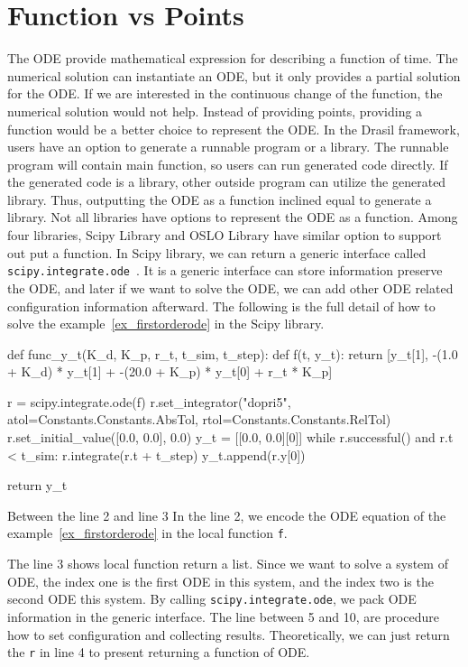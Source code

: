 \section{Function vs Points}
The ODE provide mathematical expression for describing a function of time. The numerical solution can instantiate an ODE, but it only provides a partial solution for the ODE. If we are interested in the continuous change of the function, the numerical solution would not help. Instead of providing points, providing a function would be a better choice to represent the ODE. In the Drasil framework, users have an option to generate a runnable program or a library. The runnable program will contain main function, so users can run generated code directly. If the generated code is a library, other outside program can utilize the generated library. Thus, outputting the ODE as a function inclined equal to generate a library. Not all libraries have options to represent the ODE as a function. Among four libraries, Scipy Library and OSLO Library have similar option to support out put a function. In Scipy library, we can return a generic interface called \verb|scipy.integrate.ode|~\citep{scipyfun}. It is a generic interface can store information preserve the ODE, and later if we want to solve the ODE, we can add other ODE related configuration information afterward. The following is the full detail of how to solve the example~\ref{ex_firstorderode} in the Scipy library.

\begin{listing}[ht]
\begin{python1}
def func_y_t(K_d, K_p, r_t, t_sim, t_step):
    def f(t, y_t):
        return [y_t[1], -(1.0 + K_d) * y_t[1] + -(20.0 + K_p) * y_t[0] + r_t * K_p]
    
    r = scipy.integrate.ode(f)
    r.set_integrator("dopri5", atol=Constants.Constants.AbsTol, rtol=Constants.Constants.RelTol)
    r.set_initial_value([0.0, 0.0], 0.0)
    y_t = [[0.0, 0.0][0]]
    while r.successful() and r.t < t_sim:
        r.integrate(r.t + t_step)
        y_t.append(r.y[0])
    
    return y_t
\end{python1}
\label{code_pythonscipy}
\end{listing}

Between the line 2 and line 3 In the line 2, we encode the ODE equation of the example~\ref{ex_firstorderode} in the local function \verb|f|.

The line 3 shows local function return a list. Since we want to solve a system of ODE, the index one is the first ODE in this system, and the index two is the second ODE this system. By calling \verb|scipy.integrate.ode|, we pack ODE information in the generic interface. The line between 5 and 10, are procedure how to set configuration and collecting results. Theoretically, we can just return the \verb|r| in line 4 to present returning a function of ODE.

